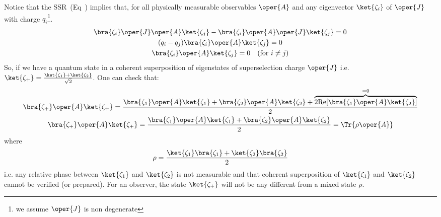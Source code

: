Notice that the SSR~(Eq~) implies that, for all  physically measurable observables $\oper{A}$ and  any eigenvector \(\ket{\zeta _i}\) of $\oper{J}$ with charge $q_i$\footnote{we assume $\oper{J}$ is non degenerate}.
\begin{equation}
	\label{eq:sSSR_orthoganility}
	\begin{gathered}
		\bra{\zeta_i}\oper{J}\oper{A}\ket{\zeta_j} - \bra{\zeta_i}\oper{A}\oper{J}\ket{\zeta_j} = 0\\
		(q_i - q_j)\bra{\zeta_i}\oper{A}\ket{\zeta_j} = 0\\
		\bra{\zeta_i}\oper{A}\ket{\zeta_j} = 0 \quad (\text{for } i\not = j)
	\end{gathered}
\end{equation}
So,  if we have a quantum state in a coherent superposition of eigenstates of superselection charge $\oper{J}$ i.e. \(\ket{\zeta _+} = \frac{\ket{\zeta _1} + \ket{\zeta_2}}{\sqrt{2}}\). One can check that:
\begin{equation}
	\begin{gathered}
		\bra{\zeta_+}\oper{A}\ket{\zeta_+} =  \frac{\bra{\zeta_1}\oper{A}\ket{\zeta_1} +  \bra{\zeta_2}\oper{A}\ket{\zeta_2} + \overbrace{2\mathrm{Re}[\bra{\zeta_1}\oper{A}\ket{\zeta_2}]}
			^{=0}
		}{2}\\
		\bra{\zeta_+}\oper{A}\ket{\zeta_+} =  \frac{\bra{\zeta_1}\oper{A}\ket{\zeta_1} +  \bra{\zeta_2}\oper{A}\ket{\zeta_2}}{2} = \Tr{\rho \oper{A}}
	\end{gathered}
\end{equation}
where
\begin{equation}
	\rho = \frac{\ket{\zeta_1}\bra{\zeta_1} + \ket{\zeta_2}\bra{\zeta_2}}{2}
\end{equation}
i.e. any relative phase between \(\ket{\zeta_1}\) and \(\ket{\zeta_2}\) is not measurable 
and that coherent superposition of \(\ket{\zeta_1}\) and \(\ket{\zeta_2}\) cannot be 
verified (or prepared). For an observer, the state \(\ket{\zeta_+}\) will not be any 
different from a mixed state \(\rho\). 